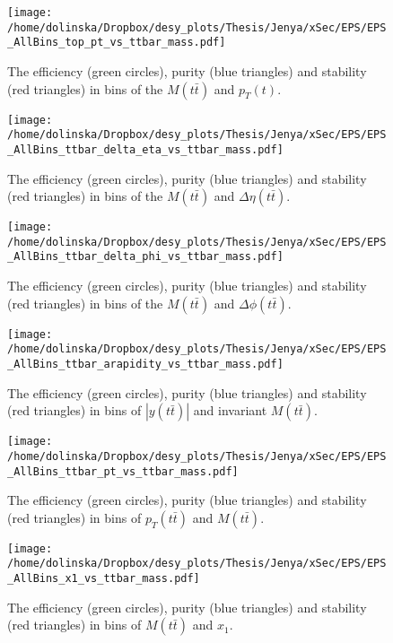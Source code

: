 \begin{figure}[p]
  \centering
  \texttt{[image: /home/dolinska/Dropbox/desy\_plots/Thesis/Jenya/xSec/EPS/EPS\_AllBins\_top\_pt\_vs\_ttbar\_mass.pdf]}
  \caption{The efficiency (green circles), purity (blue triangles) and stability (red triangles) in bins of the $M(t\bar{t})$ and $p_{T}(t)$.}
  \label{fig:EPS_2D_Mtt_pt}
\end{figure}

\begin{figure}[p]
  \centering
  \texttt{[image: /home/dolinska/Dropbox/desy\_plots/Thesis/Jenya/xSec/EPS/EPS\_AllBins\_ttbar\_delta\_eta\_vs\_ttbar\_mass.pdf]}
  \caption{The efficiency (green circles), purity (blue triangles) and stability (red triangles) in bins of the $M(t\bar{t})$ and $\Delta\eta(t\bar{t})$.}
  \label{fig:EPS_2D_Mtt_eta}
\end{figure}

\begin{figure}[p]
  \centering
  \texttt{[image: /home/dolinska/Dropbox/desy\_plots/Thesis/Jenya/xSec/EPS/EPS\_AllBins\_ttbar\_delta\_phi\_vs\_ttbar\_mass.pdf]}
  \caption{The efficiency (green circles), purity (blue triangles) and stability (red triangles) in bins of the $M(t\bar{t})$ and $\Delta\phi(t\bar{t})$.}
  \label{fig:EPS_2D_Mtt_phi}
\end{figure}

\begin{figure}[p]
  \centering
  \texttt{[image: /home/dolinska/Dropbox/desy\_plots/Thesis/Jenya/xSec/EPS/EPS\_AllBins\_ttbar\_arapidity\_vs\_ttbar\_mass.pdf]}
  \caption{The efficiency (green circles), purity (blue triangles) and stability (red triangles) in bins of $|y(t\bar{t})|$ and invariant $M(t\bar{t})$.}
  \label{fig:EPS_2D_ytt_Mtt}
\end{figure}

\begin{figure}[p]
  \centering
  \texttt{[image: /home/dolinska/Dropbox/desy\_plots/Thesis/Jenya/xSec/EPS/EPS\_AllBins\_ttbar\_pt\_vs\_ttbar\_mass.pdf]}
  \caption{The efficiency (green circles), purity (blue triangles) and stability (red triangles) in bins of $p_{T}(t\bar{t})$ and $M(t\bar{t})$.}
  \label{fig:EPS_2D_pttt_Mtt}
\end{figure}


\begin{figure}[p]
  \centering
  \texttt{[image: /home/dolinska/Dropbox/desy\_plots/Thesis/Jenya/xSec/EPS/EPS\_AllBins\_x1\_vs\_ttbar\_mass.pdf]}
  \caption{The efficiency (green circles), purity (blue triangles) and stability (red triangles) in bins of $M(t\bar{t})$ and  $x_{1}$.}
  \label{fig:EPS_2D_Mtt_x1}
\end{figure}